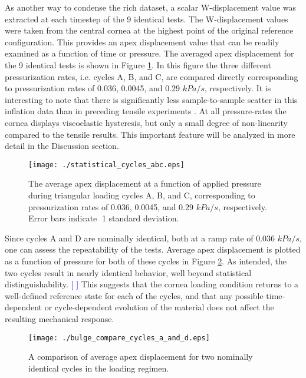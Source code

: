\documentclass[11pt,oneside]{elsart}
\newcommand{\figref}[1]{Figure \ref{#1}}
\newcommand{\comment}[1]{\textcolor{blue}{[ \sc{#1} ]}} %
\begin{document}
As another way to condense the rich dataset, a scalar W-displacement value was extracted at each timestep of the 9 identical tests.  The W-displacement values were taken from the central cornea at the highest point of the original reference configuration.  This provides an apex displacement value that can be readily examined as a function of time or pressure.  The averaged apex displacement for the 9 identical tests is shown in \figref{fig:statistical_cyclesABC}.  In this figure the three different pressurization rates, i.e. cycles A, B, and C, are compared directly corresponding to pressurization rates of 0.036, 0.0045, and 0.29 $kPa/s$, respectively.  It is interesting to note that there is significantly less sample-to-sample scatter in this inflation data than in preceding tensile experiments \cite{Boyce2006}.  At all pressure-rates the cornea displays viscoelastic hysteresis, but only a small degree of non-linearity compared to the tensile results.  This important feature will be analyzed in more detail in the Discussion section.  
%
\begin{figure}[hptb]
\begin{center}
  \resizebox{\textwidth}{!}
{\texttt{[image: ./statistical\_cycles\_abc.eps]}} 
  \caption{The average apex displacement at a function of applied pressure during triangular loading cycles A, B, and C, corresponding to pressurization rates of 0.036, 0.0045, and 0.29 $kPa/s$, respectively.  Error bars indicate 1 standard deviation.}
  \label{fig:statistical_cyclesABC}
\end{center}
\end{figure}

Since cycles A and D are nominally identical, both at a ramp rate of 0.036 $kPa/s$, one can assess the repeatability of the tests.  Average apex displacement is plotted as a function of pressure for both of these cycles in \figref{fig:bulge_compare_cyclesAandD}.  As intended, the two cycles result in nearly identical behavior, well beyond statistical distinguishability.  
\comment{REJ: add error bars?}
This suggests that the cornea loading condition returns to a well-defined reference state for each of the cycles, and that any possible time-dependent or cycle-dependent evolution of the material does not affect the resulting mechanical response.
%
\begin{figure}[hptb]
\begin{center}
  \resizebox{0.6\textwidth}{!}
{\texttt{[image: ./bulge\_compare\_cycles\_a\_and\_d.eps]}} 
  \caption{A comparison of average apex displacement for two nominally identical cycles in the loading regimen.}
  \label{fig:bulge_compare_cyclesAandD}
\end{center}
\end{figure}
\end{document}
